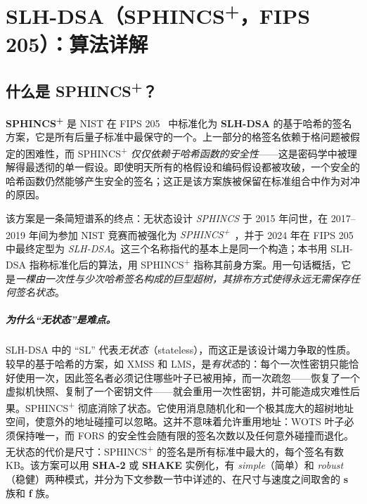 \chapter{SLH-DSA（SPHINCS\textsuperscript{+}，FIPS 205）：算法详解}
\label{ch:slhdsa}

\section{什么是 SPHINCS\textsuperscript{+}？}

\textbf{SPHINCS\textsuperscript{+}} 是 NIST 在 FIPS 205~\cite{fips205,sphincsplus2019} 中标准化为 \textbf{SLH-DSA} 的基于哈希的签名方案，它是所有后量子标准中最保守的一个。上一部分的格签名依赖于格问题被假定的困难性，而 SPHINCS\textsuperscript{+} \emph{仅仅依赖于哈希函数的安全性}——这是密码学中被理解得最透彻的单一假设。即使明天所有的格假设和编码假设都被攻破，一个安全的哈希函数仍然能够产生安全的签名；这正是该方案族被保留在标准组合中作为对冲的原因。

该方案是一条简短谱系的终点：无状态设计 \emph{SPHINCS} 于 2015 年问世，在 2017--2019 年间为参加 NIST 竞赛而被强化为 \emph{SPHINCS\textsuperscript{+}}~\cite{sphincsplus2019}，并于 2024 年在 FIPS 205 中最终定型为 \emph{SLH-DSA}。这三个名称指代的基本上是同一个构造；本书用 SLH-DSA 指称标准化后的算法，用 SPHINCS\textsuperscript{+} 指称其前身方案。用一句话概括，它是\emph{一棵由一次性与少次哈希签名构成的巨型超树，其排布方式使得永远无需保存任何签名状态}。

\paragraph{为什么“无状态”是难点。}
SLH-DSA 中的 “SL” 代表\emph{无状态}（stateless），而这正是该设计竭力争取的性质。较早的基于哈希的方案，如 XMSS 和 LMS，是\emph{有状态}的：每个一次性密钥只能恰好使用一次，因此签名者必须记住哪些叶子已被用掉，而一次疏忽——恢复了一个虚拟机快照、复制了一个密钥文件——就会重用一次性密钥，并可能造成灾难性后果。SPHINCS\textsuperscript{+} 彻底消除了状态。它使用消息随机化和一个极其庞大的超树地址空间，使意外的地址碰撞可以忽略。这并不意味着允许重用地址：WOTS 叶子必须保持唯一，而 FORS 的安全性会随有限的签名次数以及任何意外碰撞而退化。无状态的代价是尺寸：SPHINCS\textsuperscript{+} 的签名是所有标准中最大的，每个签名有数 KB。该方案可以用 \textbf{SHA-2} 或 \textbf{SHAKE} 实例化，有 \emph{simple}（简单）和 \emph{robust}（稳健）两种模式，并分为下文参数一节中详述的、在尺寸与速度之间取舍的 \textbf{s} 族和 \textbf{f} 族。

